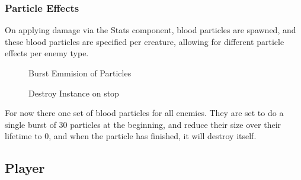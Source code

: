 \documentclass[12pt]{report}
\begin{document}
\subsubsection{Particle Effects}
On applying damage via the Stats component, blood particles are spawned, and these blood particles are specified per creature, allowing for different particle effects per enemy type. 

\begin{figure}[H]
    \begin{minipage}{.5\textwidth}
        \centering
        \caption{Burst Emmision of Particles}
    \end{minipage}
    \begin{minipage}{.5\textwidth}
        \centering
        \caption{Destroy Instance on stop}
    \end{minipage}
\end{figure}

For now there one set of blood particles for all enemies. They are set to do a single burst of 30 particles at the beginning, and reduce their size over their lifetime to 0, and when the particle has finished, it will destroy itself. 



\subsection{Player}
\end{document}
